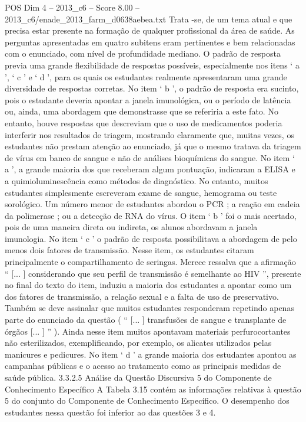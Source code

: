 \begin{textsample}{POS Dim 4 – 2013\_c6 – Score 8.00 – 2013\_c6/enade\_2013\_farm\_d0638aebea.txt}
Trata -se, de um tema atual e que precisa estar presente na formação de qualquer profissional da área de saúde.
As perguntas apresentadas em quatro subitens eram pertinentes e bem relacionadas com o enunciado, com nível de profundidade mediano.
O padrão de resposta previa uma grande flexibilidade de respostas possíveis, especialmente nos itens ‘ a ’, ‘ c ’ e ‘ d ’, para os quais os estudantes realmente apresentaram uma grande diversidade de respostas corretas.
No item ‘ b ’, o padrão de resposta era sucinto, pois o estudante deveria apontar a janela imunológica, ou o período de latência ou, ainda, uma abordagem que demonstrasse que se referiria a este fato.
No entanto, houve respostas que descreviam que o uso de medicamentos poderia interferir nos resultados de triagem, mostrando claramente que, muitas vezes, os estudantes não prestam atenção ao enunciado, já que o mesmo tratava da triagem de vírus em banco de sangue e não de análises bioquímicas do sangue.
No item ‘ a ’, a grande maioria dos que receberam algum pontuação, indicaram a ELISA e a quimioluminescência como métodos de diagnóstico.
No entanto, muitos estudantes simplesmente escreveram exame de sangue, hemograma ou teste sorológico.
Um número menor de estudantes abordou o PCR ; a reação em cadeia da polimerase ; ou a detecção de RNA do vírus.
O item ‘ b ’ foi o mais acertado, pois de uma maneira direta ou indireta, os alunos abordavam a janela imunologia.
No item ‘ c ’ o padrão de resposta possibilitava a abordagem de pelo menos dois fatores de transmissão.
Nesse item, os estudantes citaram principalmente o compartilhamento de seringas.
Merece ressalva que a afirmação “ [... ] considerando que seu perfil de transmissão é semelhante ao HIV ”, presente no final do texto do item, induziu a maioria dos estudantes a apontar como um dos fatores de transmissão, a relação sexual e a falta de uso de preservativo.
Também se deve assinalar que muitos estudantes responderam repetindo apenas parte do enunciado da questão ( “ [... ] transfusões de sangue e transplante de órgãos [... ] ” ).
Ainda nesse item muitos apontavam materiais perfurocortantes não esterilizados, exemplificando, por exemplo, os alicates utilizados pelas manicures e pedicures.
No item ‘ d ’ a grande maioria dos estudantes apontou as campanhas públicas e o acesso ao tratamento como as principais medidas de saúde pública. 3.3.2.5 Análise da Questão Discursiva 5 do Componente de Conhecimento Específico A Tabela 3.15 contém as informações relativas à questão 5 do conjunto do Componente de Conhecimento Específico.
O desempenho dos estudantes nessa questão foi inferior ao das questões 3 e 4.

\end{textsample}
